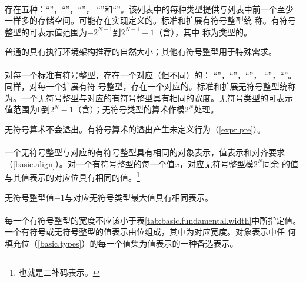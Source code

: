 \paragraph{} %
存在五种：“”，“”，“”，
“”和“”。该列表中的每种类型提供与列表中前一个至少
一样多的存储空间。可能存在实现定义的。标准和扩展有符号整型统
称。有符号整型的可表示值范围为$-2^{N-1}$到$2^{N-1}-1$（含），其中
称为类型的。

\begin{note}
  普通的具有执行环境架构推荐的自然大小；其他有符号整型用于特殊需求。
\end{note}

\paragraph{} %
对每一个标准有符号整型，存在一个对应（但不同）的：
“”，“”，“”，
“”，“”。同样，对每一个扩展有符
号整型，存在一个对应的。标准和扩展无符号整型统称为。一个无符号整型与对应的有符号整型具有相同的宽度。无符号类型的可表示
值范围为$0$到$2^N-1$（含）；无符号类型的算术作模$2^N$处理。

\begin{note}
  无符号算术不会溢出。有符号算术的溢出产生未定义行为（\ref{expr.pre}）。
\end{note}

\paragraph{} %
一个无符号整型与对应的有符号整型具有相同的对象表示，值表示和对齐要求
（\ref{basic.align}）。对一个有符号整型的每一个值$x$，对应无符号整型模$2^N$同余
的值与其值表示的对应位具有相同的值。\footnote{也就是二补码表示。}

\begin{example}
  无符号整型值$-1$与对应无符号类型最大值具有相同表示。
\end{example}

\paragraph{} %
每一个有符号整型的宽度不应该小于表\ref{tab:basic.fundamental.width}中所指定值。
一个有符号或无符号整型的值表示由位组成，其中为对应宽度。对象表示中任
何填充位（\ref{basic.types}）的每一个值集为值表示的一种备选表示。

